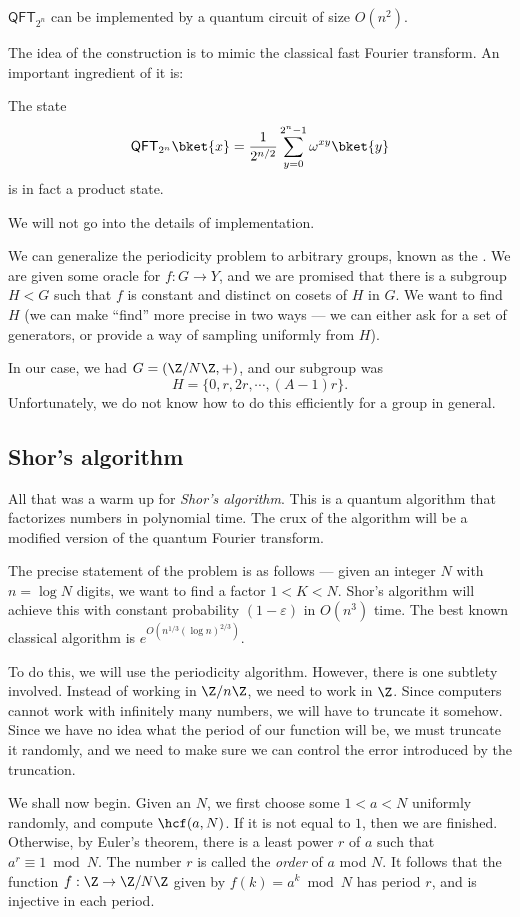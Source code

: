 \documentclass[a4paper]{article}
\newcommand{\qQFT}{\mathsf{QFT}}
\begin{document}
\begin{fact}
  $\qQFT_{2^n}$ can be implemented by a quantum circuit of size $O(n^2)$.
\end{fact}
The idea of the construction is to mimic the classical fast Fourier transform. An important ingredient of it is:
\begin{fact}
  The state
  \[
    \qQFT_{2^n} \bket{x} = \frac{1}{2^{n/2}} \sum_{y = 0}^{2^n - 1} \omega^{xy}\bket{y}
  \]
  is in fact a product state.
\end{fact}
We will not go into the details of implementation.

We can generalize the periodicity problem to arbitrary groups, known as the . We are given some oracle for $f: G \to Y$, and we are promised that there is a subgroup $H < G$ such that $f$ is constant and distinct on cosets of $H$ in $G$. We want to find $H$ (we can make ``find'' more precise in two ways --- we can either ask for a set of generators, or provide a way of sampling uniformly from $H$).

In our case, we had $G = (\Z/N\Z, +)$, and our subgroup was
\[
  H = \{0, r, 2r, \cdots, (A - 1) r\}.
\]
Unfortunately, we do not know how to do this efficiently for a group in general.

\subsection{Shor's algorithm}
All that was a warm up for \emph{Shor's algorithm}. This is a quantum algorithm that factorizes numbers in polynomial time. The crux of the algorithm will be a modified version of the quantum Fourier transform.

The precise statement of the problem is as follows --- given an integer $N$ with $n = \log N$ digits, we want to find a factor $1 < K < N$. Shor's algorithm will achieve this with constant probability $(1 - \varepsilon)$ in $O(n^3)$ time. The best known classical algorithm is $e^{O(n^{1/3} (\log n)^{2/3})}$.

To do this, we will use the periodicity algorithm. However, there is one subtlety involved. Instead of working in $\Z/n\Z$, we need to work in $\Z$. Since computers cannot work with infinitely many numbers, we will have to truncate it somehow. Since we have no idea what the period of our function will be, we must truncate it randomly, and we need to make sure we can control the error introduced by the truncation.

We shall now begin. Given an $N$, we first choose some $1 < a < N$ uniformly randomly, and compute $\hcf(a, N)$. If it is not equal to $1$, then we are finished. Otherwise, by Euler's theorem, there is a least power $r$ of $a$ such that $a^r \equiv 1 \bmod N$. The number $r$ is called the \emph{order} of $a$ mod $N$. It follows that the function $f: \Z \to \Z/N\Z$ given by $f(k) = a^k \bmod N$ has period $r$, and is injective in each period.
\end{document}

